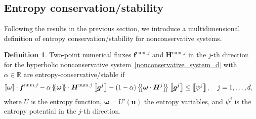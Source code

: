 \documentclass[]{scrartcl}
\newcommand*{\ldblbrace}{\{\mskip-5mu \left \{}
\newcommand*{\rdblbrace}{ \}\mskip-5mu \right \}}
\newcommand{\mean}[1]{\left\ldblbrace #1 \right\rdblbrace}
\newcommand{\mtx}[1]{\boldsymbol{#1}}
\renewcommand{\vec}[1]{\boldsymbol{#1}}
\newcommand{\jump}[1]{\left\llbracket #1  \right\rrbracket}
\theoremstyle{definition}
\newtheorem{definition}[theorem]{Definition}
\begin{document}
\subsection{Entropy conservation/stability}

Following the results in the previous section, we introduce a multidimensional definition of entropy conservation/stability for nonconservative systems.
\begin{definition}\label{Convex_d}
Two-point numerical fluxes $\vec{f}^{\mathrm{num},j}$ and $\mtx{H}^{\mathrm{num},j}$ in the $j$-th direction for the hyperbolic nonconservative system~\eqref{nonconservative_system_d} with $\alpha \in \mathbb{R}$ are entropy-conservative/stable if
\begin{equation}
\label{TadmorDef_convex_d}
	\jump{\vec{\omega}}\cdot \vec{f}^{\mathrm{num},j} -\alpha \mean{\vec{\omega}}\cdot \vec{H}^{\mathrm{num},j}\jump{\vec{g}^j} -(1-\alpha) \mean{\vec{\omega} \cdot \vec{H}^j}\jump{\vec{g}^j} \leq \jump{\psi^j}, \quad j = 1, \dots, d,
\end{equation}
where $U$ is the entropy function, $\vec{\omega} = U'(\vec{u})$ the entropy variables, and $\psi^j$ is the entropy potential in the $j$-th direction.
\end{definition}
\end{document}
